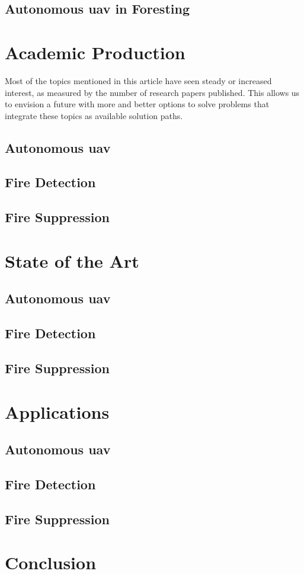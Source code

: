 \documentclass[runningheads]{llncs}
\begin{document}
\subsection{Autonomous \acrshort{uav} in Foresting}


\section{Academic Production}

Most of the topics mentioned in this article have seen steady or increased interest, as measured by the number of research papers published. This allows us to envision a future with more and better options to solve problems that integrate these topics as available solution paths.

\subsection{Autonomous \acrshort{uav}}

\subsection{Fire Detection}

\subsection{Fire Suppression}

\section{State of the Art}

\subsection{Autonomous \acrshort{uav}}

\subsection{Fire Detection}

\subsection{Fire Suppression}

\section{Applications}

\subsection{Autonomous \acrshort{uav}}

\subsection{Fire Detection}

\subsection{Fire Suppression}

\section{Conclusion}


\end{document}
